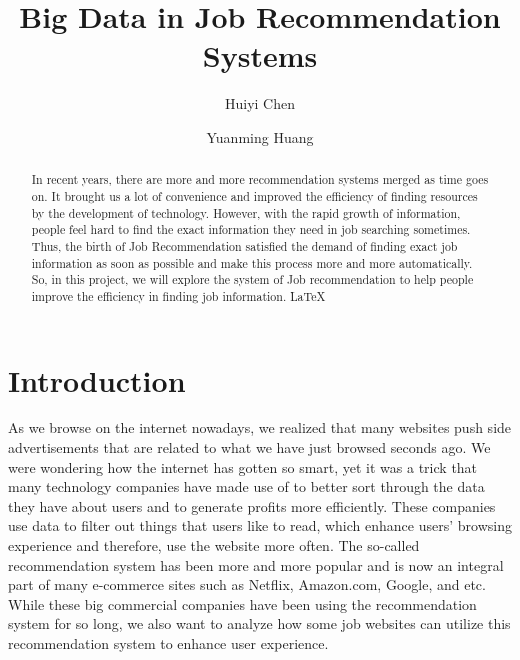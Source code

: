 \documentclass[sigconf]{acmart}
\begin{document}
\title{Big Data in Job Recommendation Systems}


\author{Huiyi Chen}



\author{Yuanming Huang}

\renewcommand{\shortauthors}{H. CHEN, Y. Huang}


\begin{abstract}
In recent years, there are more and more recommendation systems merged as time goes on. It brought us a lot of convenience and improved the efficiency of finding resources by the development of technology. However, with the rapid growth of information, people feel hard to find the exact information they need in job searching sometimes. Thus, the birth of Job Recommendation satisfied the demand of finding exact job information as soon as possible and make this process more and more automatically. So, in this project, we will explore the system of Job recommendation to help people improve the efficiency in finding job information.
\LaTeX\
\end{abstract}



\maketitle

\section{Introduction}

As we browse on the internet nowadays, we realized that many websites push side advertisements that are related to what we have just browsed seconds ago. We were wondering how the internet has gotten so smart, yet it was a trick that many technology companies have made use of to better sort through the data they have about users and to generate profits more efficiently. These companies use data to filter out things that users like to read, which enhance users' browsing experience and therefore, use the website more often. The so-called recommendation system has been more and more popular and is now an integral part of many e-commerce sites such as Netflix, Amazon.com, Google, and etc. While these big commercial companies have been using the recommendation system for so long, we also want to analyze how some job websites can utilize this recommendation system to enhance user experience. 
\end{document}
